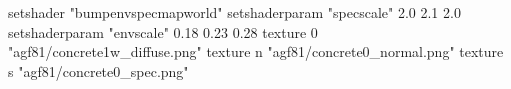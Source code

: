 setshader "bumpenvspecmapworld"
setshaderparam "specscale" 2.0 2.1 2.0
setshaderparam "envscale"  0.18 0.23 0.28
    texture 0 "agf81/concrete1w_diffuse.png"
    texture n "agf81/concrete0_normal.png"
    texture s "agf81/concrete0_spec.png"